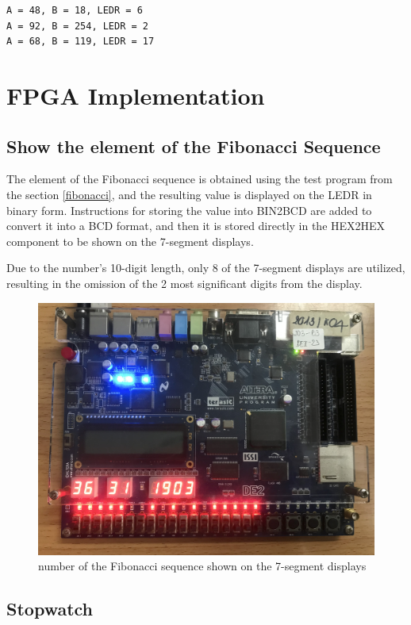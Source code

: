 \documentclass[12pt,a4paper,oneside]{book} %
\begin{document}
\begin{verbatim}
A = 48, B = 18, LEDR = 6
A = 92, B = 254, LEDR = 2
A = 68, B = 119, LEDR = 17
\end{verbatim}

\chapter{FPGA Implementation}
\section{Show the  element of the Fibonacci Sequence}
The  element of the Fibonacci sequence is obtained using the test program from the section \ref{fibonacci}, and the resulting value is displayed on the LEDR in binary form. Instructions for storing the value into BIN2BCD are added to convert it into a BCD format, and then it is stored directly in the HEX2HEX component to be shown on the 7-segment displays.

Due to the number's 10-digit length, only 8 of the 7-segment displays are utilized, resulting in the omission of the 2 most significant digits from the display.

\begin{figure}[H]
    \centering
    \includegraphics[width=.8\textwidth]{images/fibonacci_fpga.jpg}
    \caption{ number of the Fibonacci sequence shown on the 7-segment displays}
\end{figure}

\section{Stopwatch}
\end{document}
